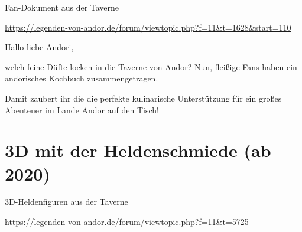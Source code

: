{\begin{center}
    Fan-Dokument aus der Taverne

    \url{https://legenden-von-andor.de/forum/viewtopic.php?f=11&t=1628&start=110}
\end{center}


Hallo liebe Andori,

welch feine Düfte locken in die Taverne von Andor? Nun, fleißige Fans haben ein andorisches Kochbuch zusammengetragen.\bigskip

Damit zaubert ihr die die perfekte kulinarische Unterstützung für ein großes Abenteuer im Lande Andor auf den Tisch!





\newpage
\section{3D mit der Heldenschmiede (ab 2020)}

\begin{center}
    3D-Heldenfiguren aus der Taverne

    \url{https://legenden-von-andor.de/forum/viewtopic.php?f=11&t=5725}
\end{center}

}
